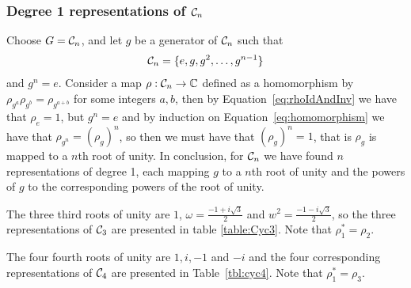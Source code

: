 \subsubsection{Degree 1 representations of $\mathcal{C}_n$}\label{sect:deg1cycn}

Choose $G = \mathcal{C}_n$, and let $g$ be a generator of $\mathcal{C}_n$ such that 
\begin{align*}
	\mathcal{C}_n = \{ e, g, g^2, \dots, g^{n-1}\}
\end{align*}
and $g^n = e$. Consider a map $\rho: \mathcal{C}_n \rightarrow \mathbb{C}$ defined as a homomorphism by $\rho_{g^a}\rho_{g^b} = \rho_{g^{a+b}}$ for some integers $a,b$, then by Equation~\ref{eq:rhoIdAndInv} we have that $\rho_e = 1$, but $g^n = e$ and by induction on Equation~\ref{eq:homomorphism} we have that $\rho_{g^n} = (\rho_g)^n$, so then we must have that $(\rho_g)^n = 1$, that is $\rho_g$ is mapped to a $n$th root of unity.
In conclusion, for $\mathcal{C}_n$ we have found $n$ representations of degree 1, each mapping $g$ to a $n$th root of unity and the powers of $g$ to the corresponding powers of the root of unity. 

\begin{example}[$\Cyc_3$]
	The three third roots of unity are $1$, $\omega = \frac{-1+i\sqrt{3}}{2}$ and $w^2 = \frac{-1-i\sqrt{3}}{2}$, so the three representations of $\Cyc_3$ are presented in table \ref{table:Cyc3}. Note that $\rho_1^* = \rho_2$.
	
\end{example}

\begin{example}[$\Cyc_4$]
	The four fourth roots of unity are $1,i,-1$ and $-i$ and the four corresponding representations of $\Cyc_4$ are presented in Table~\ref{tbl:cyc4}. Note that $\rho_1^* = \rho_3$.
\end{example}
	
